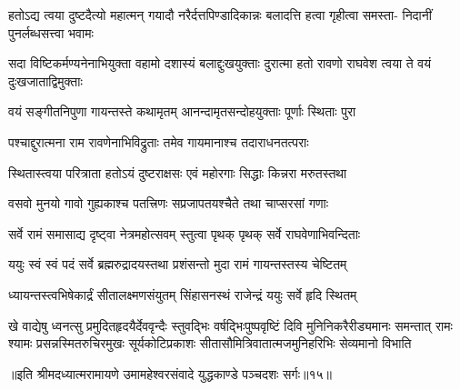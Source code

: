 \begin{minipage}{\linewidth}
\centering
{}

\fourlineindentedshloka
{हतोऽद्य त्वया दुष्टदैत्यो महात्मन्}
{गयादौ नरैर्दत्तपिण्डादिकान्नः}
{बलादत्ति हत्वा गृहीत्वा समस्ता-}
{निदानीं पुनर्लब्धसत्त्वा भवामः} %
\end{minipage}

\begin{minipage}{\linewidth}
\centering
{}

\fourlineindentedshloka
{सदा विष्टिकर्मण्यनेनाभियुक्ता}
{वहामो दशास्यं बलाद्दुःखयुक्ताः}
{दुरात्मा हतो रावणो राघवेश}
{त्वया ते वयं दुःखजाताद्विमुक्ताः} %
\end{minipage}

\begin{minipage}{\linewidth}
\centering
{}

\twolineshloka
{वयं सङ्गीतनिपुणा गायन्तस्ते कथामृतम्}
{आनन्दामृतसन्दोहयुक्ताः पूर्णाः स्थिताः पुरा} %
\end{minipage}

\twolineshloka
{पश्चाद्दुरात्मना राम रावणेनाभिविद्रुताः}
{तमेव गायमानाश्च तदाराधनतत्पराः} %

\twolineshloka
{स्थितास्त्वया परित्राता हतोऽयं दुष्टराक्षसः}
{एवं महोरगाः सिद्धाः किन्नरा मरुतस्तथा} %

\twolineshloka
{वसवो मुनयो गावो गुह्यकाश्च पतत्त्रिणः}
{सप्रजापतयश्चैते तथा चाप्सरसां गणाः} %

\twolineshloka
{सर्वे रामं समासाद्य दृष्ट्वा नेत्रमहोत्सवम्}
{स्तुत्वा पृथक् पृथक् सर्वे राघवेणाभिवन्दिताः} %

\twolineshloka
{ययुः स्वं स्वं पदं सर्वे ब्रह्मरुद्रादयस्तथा}
{प्रशंसन्तो मुदा रामं गायन्तस्तस्य चेष्टितम्} %

\twolineshloka
{ध्यायन्तस्त्वभिषेकार्द्रं सीतालक्ष्मणसंयुतम्}
{सिंहासनस्थं राजेन्द्रं ययुः सर्वे हृदि स्थितम्} %

\fourlineindentedshloka
{खे वाद्येषु ध्वनत्सु प्रमुदितहृदयैर्देववृन्दैः स्तुवद्भिः}
{वर्षद्भिःपुष्पवृष्टिं दिवि मुनिनिकरैरीड्यमानः समन्तात्}
{रामः श्यामः प्रसन्नस्मितरुचिरमुखः सूर्यकोटिप्रकाशः}
{सीतासौमित्रिवातात्मजमुनिहरिभिः सेव्यमानो विभाति} %

{॥इति श्रीमदध्यात्मरामायणे उमामहेश्वरसंवादे युद्धकाण्डे
पञ्चदशः सर्गः॥१५॥
}





